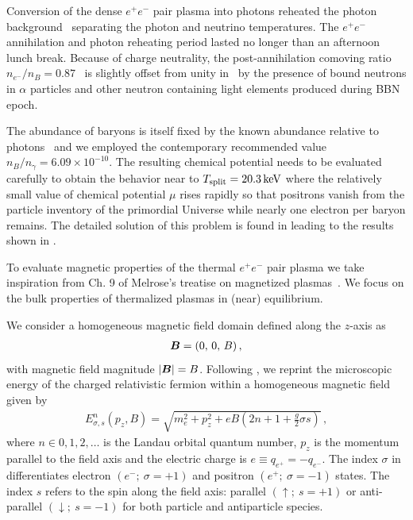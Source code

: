 Conversion of the dense $e^{+}e^{-}$ pair plasma into photons reheated the photon background~\cite{Birrell:2014uka} separating the photon and neutrino temperatures. The $e^{+}e^{-}$ annihilation and photon reheating period lasted no longer than an afternoon lunch break. Because of charge neutrality, the post-annihilation comoving ratio $n_{e^{-}}/n_{B}=0.87$~\cite{Rafelski:2023emw} is slightly offset from unity in~ by the presence of bound neutrons in $\alpha$ particles and other neutron containing light elements produced during BBN epoch.

The abundance of baryons is itself fixed by the known abundance relative to photons~\cite{ParticleDataGroup:2022pth} and we employed the contemporary recommended value $n_B/n_\gamma=6.09\times 10^{-10}$. The resulting chemical potential needs to be evaluated carefully to obtain the behavior near to $T_\mathrm{split}=20.3\text{\,keV}$ where the relatively small value of chemical potential $\mu$ rises rapidly so that positrons vanish from the particle inventory of the primordial Universe while nearly one electron per baryon remains. The detailed solution of this problem is found in \cite{Fromerth:2012fe,Rafelski:2023emw} leading to the results shown in .

\noindent To evaluate magnetic properties of the thermal $e^{+}e^{-}$ pair plasma we take inspiration from Ch. 9 of Melrose's treatise on magnetized plasmas~\cite{melrose2008quantum}. We focus on the bulk properties of thermalized plasmas in (near) equilibrium.

We consider a homogeneous magnetic field domain defined along the $z$-axis as
\begin{gather}
 \label{homoB:1}
 \boldsymbol{B}=(0,\,0,\,B)\,,
\end{gather}
with magnetic field magnitude $|\boldsymbol{B}|=B$. Following \cite{Steinmetz:2018ryf}, we reprint the microscopic energy of the charged relativistic fermion within a homogeneous magnetic field given by
\begin{align}
 \label{cosmokgp}
 E^{n}_{\sigma,s}(p_{z},{B})=\sqrt{m_{e}^{2}+p_{z}^{2}+e{B}\left(2n+1+\frac{g}{2}\sigma s\right)}\,,
\end{align}
where $n\in0,1,2,\ldots$ is the Landau orbital quantum number, $p_{z}$ is the momentum parallel to the field axis and the electric charge is $e\equiv q_{e^{+}}=-q_{e^{-}}$. The index $\sigma$ in  differentiates electron $(e^{-};\ \sigma=+1)$ and positron $(e^{+};\ \sigma=-1)$ states. The index $s$ refers to the spin along the field axis: parallel $(\uparrow;\ s=+1)$ or anti-parallel $(\downarrow;\ s=-1)$ for both particle and antiparticle species.

